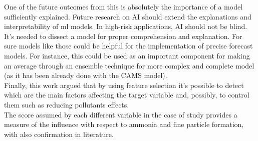 One of the future outcomes from this is absolutely the importance of a model sufficiently explained.
Future research on AI should extend the explanations and interpretability of \acrshort{ml} models.
In high-risk applications, AI should not be blind. 
It's needed to dissect a model for proper comprehension and explanation.
For sure models like those could be helpful for the implementation of precise forecast models.  
For instance, this could be used as an important component for making an average through an ensemble technique for more complex and complete model (as it has been already done with the CAMS model).
\\
Finally, this work argued that by using feature selection it's possible to detect which are the main factors affecting the target variable and, possibly, to control them such as reducing pollutants effects.\\
The score assumed by each different variable in the case of study provides a measure of the influence with respect to ammonia and fine particle formation, with also confirmation in literature.
\begin{comment}
Looking forward, further attempts for reducing pollutant formation should be made by procedures actually used.
\end{comment}
